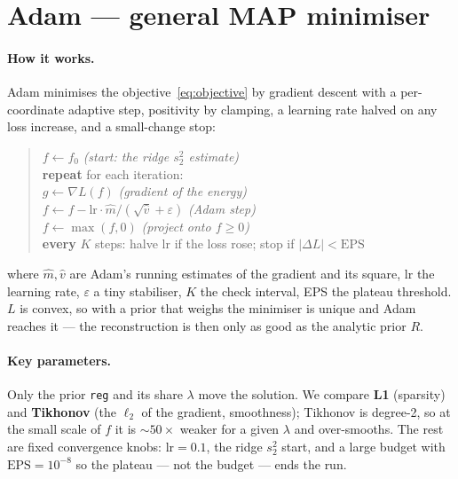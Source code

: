 \section{Adam --- general MAP minimiser}
\label{sec:adam}

\paragraph{How it works.}
Adam minimises the objective~\eqref{eq:objective} by gradient descent with a per-coordinate
adaptive step, positivity by clamping, a learning rate halved on any loss increase, and a
small-change stop:
\begin{quote}
$f \leftarrow f_0$ \hfill\textit{(start: the ridge $s_2^2$ estimate)}\\
\textbf{repeat} for each iteration:\\
\hspace{1.2em}$g \leftarrow \nabla L(f)$ \hfill\textit{(gradient of the energy)}\\
\hspace{1.2em}$f \leftarrow f - \mathrm{lr}\cdot \hat m/(\sqrt{\hat v}+\varepsilon)$ \hfill\textit{(Adam step)}\\
\hspace{1.2em}$f \leftarrow \max(f,0)$ \hfill\textit{(project onto $f\ge0$)}\\
\hspace{1.2em}\textbf{every} $K$ steps: halve $\mathrm{lr}$ if the loss rose; stop if $|\Delta L|<\text{EPS}$
\end{quote}
\noindent where $\hat m,\hat v$ are Adam's running estimates of the gradient and its square,
$\mathrm{lr}$ the learning rate, $\varepsilon$ a tiny stabiliser, $K$ the check interval, EPS the
plateau threshold. $L$ is convex, so with a prior that weighs the minimiser is unique and Adam
reaches it --- the reconstruction is then only as good as the analytic prior $R$.

\paragraph{Key parameters.}
Only the prior \texttt{reg} and its share $\lambda$ move the solution. We compare \textbf{L1}
(sparsity) and \textbf{Tikhonov} (the $\ell_2$ of the gradient, smoothness); Tikhonov is degree-2,
so at the small scale of $f$ it is ${\sim}50\times$ weaker for a given $\lambda$ and over-smooths.
The rest are fixed convergence knobs: $\mathrm{lr}=0.1$, the ridge $s_2^2$ start, and a large budget
with $\text{EPS}=10^{-8}$ so the plateau --- not the budget --- ends the run.

